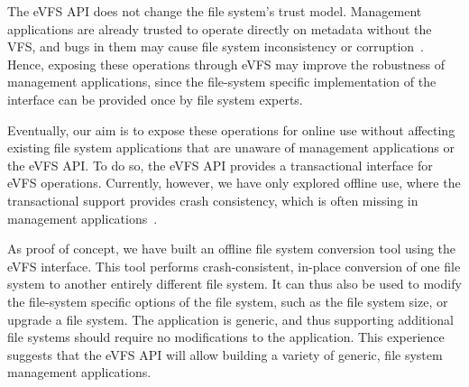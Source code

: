 The eVFS API does not change the file system's trust model. Management applications are already trusted to operate directly on metadata without the VFS, and bugs in them may cause file system inconsistency or corruption~\cite{Carreira2012,Gunawi08b}. Hence, exposing these operations through eVFS may improve the robustness of management applications, since the file-system specific implementation of the interface can be provided once by file system experts.

Eventually, our aim is to expose these operations for online use without affecting existing file system applications that are unaware of management applications or the eVFS API. To do so, the eVFS API provides a transactional interface for eVFS operations. Currently, however, we have only explored offline use, where the transactional support provides crash consistency, which is often missing in management applications~\cite{gatla2018fsck}.


As proof of concept, we have built an offline file system conversion tool using the eVFS interface. This tool performs crash-consistent, in-place conversion of one file system to another entirely different file system. It can thus also be used to modify the file-system specific options of the file system, such as the file system size, or upgrade a file system. The application is generic, and thus supporting additional file systems should require no modifications to the application. This experience suggests that the eVFS API will allow building a variety of generic, file system management applications.



